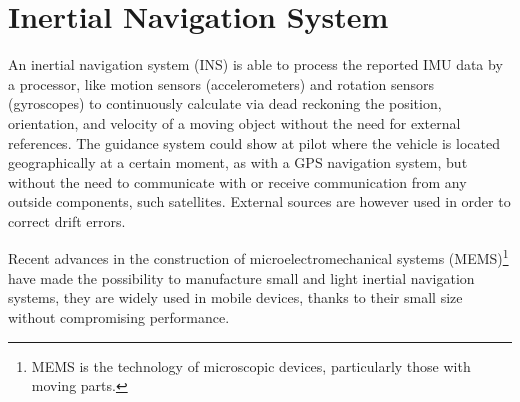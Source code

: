 \documentclass[tesi]{subfiles}
\begin{document}
\section{Inertial Navigation System}\label{sc:Inertial Navigation System}
An inertial navigation system (INS) is able to process the reported IMU data by a processor, like motion sensors (accelerometers) and rotation sensors (gyroscopes) to continuously calculate via dead reckoning the position, orientation, and velocity of a moving object without the need for external references\cite{basicprincipleaereo}.  
The guidance system could show at pilot where the vehicle is located geographically at a certain moment, as with a GPS navigation system, but without the need to communicate with or receive communication from any outside components, such satellites. External sources are however used in order to correct drift errors.

Recent advances in the construction of microelectromechanical systems (MEMS)\footnote{MEMS is the technology of microscopic devices, particularly those with moving parts.} have made the possibility to manufacture small and light inertial navigation systems, they are widely used in mobile devices, thanks to their small size without compromising performance.
\end{document}
